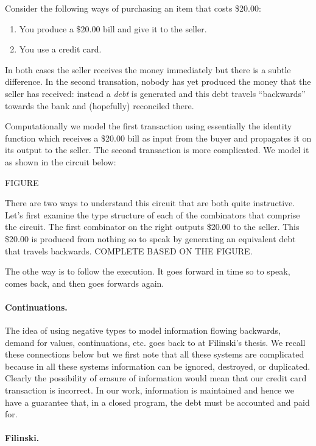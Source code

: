 \documentclass[preprint]{sigplanconf}
\begin{document}
Consider the following ways of purchasing an item that costs \$20.00:

\begin{enumerate}
\item You produce a \$20.00 bill and give it to the seller.
\item You use a credit card. 
\end{enumerate}
In both cases the seller receives the money immediately but there is a subtle
difference. In the second transation, nobody has yet produced the money that
the seller has received: instead a \emph{debt} is generated and this debt
travels ``backwards'' towards the bank and (hopefully) reconciled there.

Computationally we model the first transaction using essentially the identity
function which receives a \$20.00 bill as input from the buyer and propagates
it on its output to the seller. The second transaction is more
complicated. We model it as shown in the circuit below:

FIGURE

There are two ways to understand this circuit that are both quite
instructive. Let's first examine the type structure of each of the
combinators that comprise the circuit. The first combinator on the right
outputs \$20.00 to the seller. This \$20.00 is produced from nothing so to
speak by generating an equivalent debt that travels backwards. COMPLETE BASED
ON THE FIGURE.

The othe way is to follow the execution. It goes forward in time so to speak,
comes back, and then goes forwards again.

\paragraph*{Continuations.} The idea of using negative types to model
information flowing backwards, demand for values, continuations, etc. goes
back to at Filinski's thesis. We recall these connections below but we first
note that all these systems are complicated because in all these systems
information can be ignored, destroyed, or duplicated. Clearly the possibility
of erasure of information would mean that our credit card transaction is
incorrect. In our work, information is maintained and hence we have a
guarantee that, in a closed program, the debt must be accounted and paid for.

\paragraph*{Filinski.}
\end{document}
